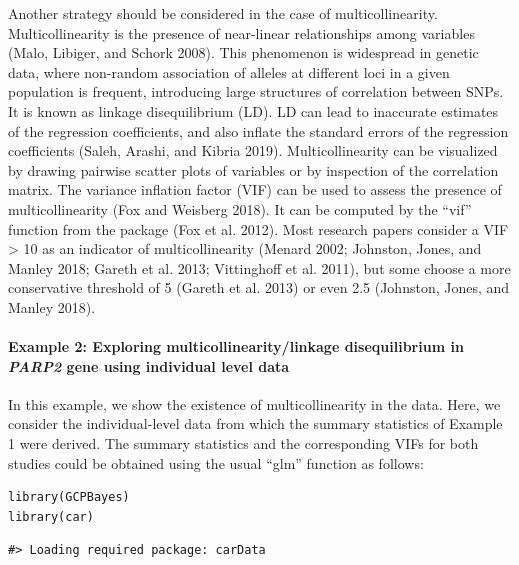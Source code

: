 Another strategy should be considered in the case of multicollinearity. Multicollinearity is the presence of near-linear relationships among variables (Malo, Libiger, and Schork 2008).
This phenomenon is widespread in genetic data, where non-random association of alleles at different loci in a given population is frequent, introducing large structures of correlation between SNPs. It is known as linkage disequilibrium (LD).
LD can lead to inaccurate estimates of the regression coefficients, and also inflate the standard errors of the regression coefficients (Saleh, Arashi, and Kibria 2019).
Multicollinearity can be visualized by drawing pairwise scatter plots of variables
or by inspection of the correlation matrix.
The variance inflation factor (VIF) can be used to assess the presence of multicollinearity (Fox and Weisberg 2018). It can be computed by the ``vif'' function from the  package (Fox et al. 2012). Most research papers consider a VIF \textgreater{} 10 as an indicator of multicollinearity (Menard 2002; Johnston, Jones, and Manley 2018; Gareth et al. 2013; Vittinghoff et al. 2011), but some choose a more conservative threshold of 5 (Gareth et al. 2013) or even 2.5 (Johnston, Jones, and Manley 2018).

\hypertarget{example-2-exploring-multicollinearitylinkage-disequilibrium-in-parp2-gene-using-individual-level-data}{%
\paragraph{\texorpdfstring{Example 2: Exploring multicollinearity/linkage disequilibrium in \emph{PARP2} gene using individual level data}{Example 2: Exploring multicollinearity/linkage disequilibrium in PARP2 gene using individual level data}}\label{example-2-exploring-multicollinearitylinkage-disequilibrium-in-parp2-gene-using-individual-level-data}}

In this example, we show the existence of multicollinearity in the data. Here, we consider the individual-level data from which the summary statistics of Example 1 were derived. The summary statistics and the corresponding VIFs for both studies could be obtained using the usual ``glm'' function as follows:

\begin{verbatim}
library(GCPBayes)
library(car)
\end{verbatim}

\begin{verbatim}
#> Loading required package: carData
\end{verbatim}

